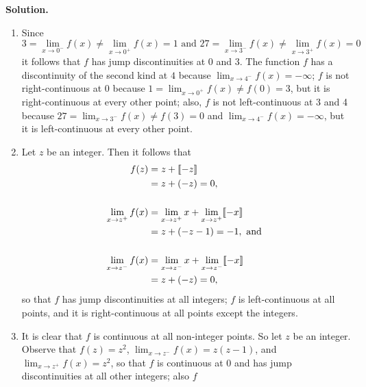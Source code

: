 \begin{enumerate}
      \textbf{Solution.}
      
      \begin{enumerate}
         \item Since
               $$3 = \lim_{x\rightarrow 0^-} f(x) \neq
                     \lim_{x\rightarrow 0^+} f(x) = 1
                 \text{ and }
                 27 = \lim_{x\rightarrow 3^-} f(x) \neq
                      \lim_{x\rightarrow 3^+} f(x) = 0$$
               it follows that $f$ has jump discontinuities at 0 and 3. The
               function $f$ has a discontinuity of the second kind at $4$
               because $\lim_{x\rightarrow 4^-} f(x) = -\infty$; $f$ is not
               right-continuous at 0 because
               $1 = \lim_{x\rightarrow 0^+} f(x) \neq f(0) = 3$, but it is
               right-continuous at every other point; also, $f$ is not
               left-continuous at 3 and 4 because
               $27 = \lim_{x\rightarrow 3^-} f(x) \neq f(3) = 0$ and
               $\lim_{x\rightarrow 4^-} f(x) = -\infty$, but it is
               left-continuous at every other point.
         \item Let $z$ be an integer. Then it follows that
               \begin{align*}
                  f(z) &= z + \lbrack\!\lbrack -z \rbrack\!\rbrack \\
                       &= z + (-z) = 0, \\ \\
                  \lim_{x\rightarrow z^+} f(x) &= \lim_{x\rightarrow z^+} x +
                  \lim_{x\rightarrow z^+} \lbrack\!\lbrack -x \rbrack\!\rbrack \\
                  &= z + (-z-1) = -1, \text{ and } \\ \\
                  \lim_{x\rightarrow z^-} f(x) &= \lim_{x\rightarrow z^-} x +
                  \lim_{x\rightarrow z^-} \lbrack\!\lbrack -x \rbrack\!\rbrack \\
                  &= z + (-z) = 0,
               \end{align*}
               so that $f$ has jump discontinuities at all integers; $f$ is
               left-continuous at all points, and it is right-continuous at all
               points except the integers.
         \item It is clear that $f$ is continuous at all non-integer points. So
               let $z$ be an integer. Observe that $f(z) = z^2$,
               $\lim_{x\rightarrow z^-} f(x) = z(z - 1)$, and
               $\lim_{x\rightarrow z^+} f(x) = z^2$, so that $f$ is continuous
               at 0 and has jump discontinuities at all other integers; also $f$

\end{enumerate}
\end{enumerate}
